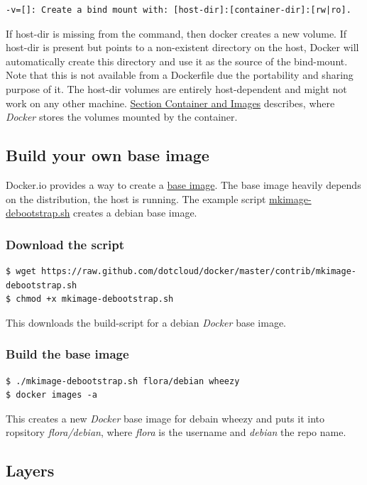 \documentclass[11pt]{article}
\begin{document}
\begin{verbatim}
-v=[]: Create a bind mount with: [host-dir]:[container-dir]:[rw|ro].
\end{verbatim}
If host-dir is missing from the command, then docker creates a new volume. If host-dir is present but points to a non-existent directory on the host, Docker will automatically create this directory and use it as the source of the bind-mount.
Note that this is not available from a Dockerfile due the portability and sharing purpose of it. The host-dir volumes are entirely host-dependent and might not work on any other machine. \hyperref[sec-2-6]{Section Container and Images} describes, where \emph{Docker} stores the volumes mounted by the container.
\subsection{Build your own base image}
\label{sec-2-4}

Docker.io provides a way to create a \href{http://docs.docker.io/en/latest/articles/baseimages/}{base image}. The base image heavily depends on the distribution, the host is running. The example script \href{https://github.com/dotcloud/docker/blob/master/contrib/mkimage-debootstrap.sh}{mkimage-debootstrap.sh} creates a debian base image.
\subsubsection{Download the script}
\label{sec-2-4-1}


\begin{verbatim}
$ wget https://raw.github.com/dotcloud/docker/master/contrib/mkimage-debootstrap.sh
$ chmod +x mkimage-debootstrap.sh
\end{verbatim}
This downloads the build-script for a debian \emph{Docker} base image.
\subsubsection{Build the base image}
\label{sec-2-4-2}


\begin{verbatim}
$ ./mkimage-debootstrap.sh flora/debian wheezy 
$ docker images -a
\end{verbatim}
This creates a new \emph{Docker} base image for debain wheezy and puts it into ropsitory \emph{flora/debian}, where \emph{flora} is the username and \emph{debian} the repo name.
\subsection{Layers}
\label{sec-2-5}
\end{document}
